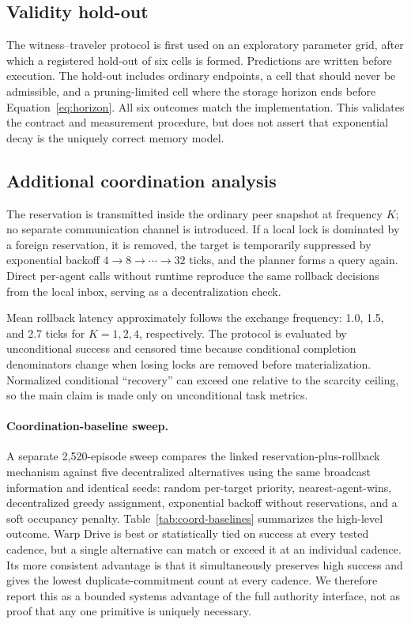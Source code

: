 \documentclass{article}
\begin{document}
\subsection{Validity hold-out}

The witness--traveler protocol is first used on an exploratory parameter grid, after which a registered hold-out of six cells is formed. Predictions are written before execution. The hold-out includes ordinary endpoints, a cell that should never be admissible, and a pruning-limited cell where the storage horizon ends before Equation~\ref{eq:horizon}. All six outcomes match the implementation. This validates the contract and measurement procedure, but does not assert that exponential decay is the uniquely correct memory model.

\subsection{Additional coordination analysis}

The reservation is transmitted inside the ordinary peer snapshot at frequency $K$; no separate communication channel is introduced. If a local lock is dominated by a foreign reservation, it is removed, the target is temporarily suppressed by exponential backoff $4\to 8\to\cdots\to 32$ ticks, and the planner forms a query again. Direct per-agent calls without runtime reproduce the same rollback decisions from the local inbox, serving as a decentralization check.

Mean rollback latency approximately follows the exchange frequency: 1.0, 1.5, and 2.7 ticks for $K=1,2,4$, respectively. The protocol is evaluated by unconditional success and censored time because conditional completion denominators change when losing locks are removed before materialization. Normalized conditional ``recovery'' can exceed one relative to the scarcity ceiling, so the main claim is made only on unconditional task metrics.

\paragraph{Coordination-baseline sweep.}
\label{app:coord-baselines}
A separate 2,520-episode sweep compares the linked reservation-plus-rollback mechanism against five decentralized alternatives using the same broadcast information and identical seeds: random per-target priority, nearest-agent-wins, decentralized greedy assignment, exponential backoff without reservations, and a soft occupancy penalty. Table~\ref{tab:coord-baselines} summarizes the high-level outcome. Warp Drive is best or statistically tied on success at every tested cadence, but a single alternative can match or exceed it at an individual cadence. Its more consistent advantage is that it simultaneously preserves high success and gives the lowest duplicate-commitment count at every cadence. We therefore report this as a bounded systems advantage of the full authority interface, not as proof that any one primitive is uniquely necessary.
\end{document}
